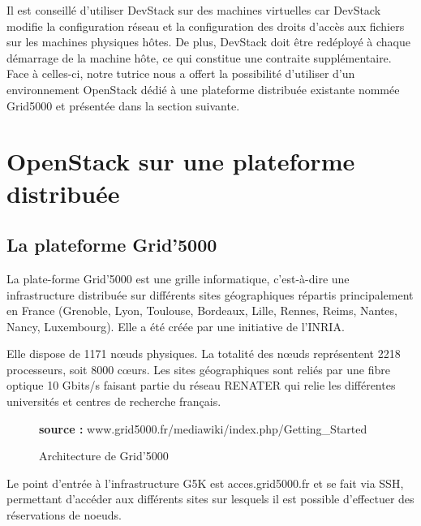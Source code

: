 \documentclass{report}
\begin{document}
    \bigbreak

    Il est conseillé d'utiliser DevStack sur des machines virtuelles car DevStack modifie la configuration réseau et la configuration des droits d'accès aux fichiers sur les machines physiques hôtes.\newline
    De plus, DevStack doit être redéployé à chaque démarrage de la machine hôte, ce qui constitue une contraite supplémentaire.\newline
    Face à celles-ci, notre tutrice nous a offert la possibilité d'utiliser d'un environnement OpenStack dédié à une plateforme distribuée existante nommée Grid5000 et présentée dans la section suivante.

    \section{OpenStack sur une plateforme distribuée}

		\subsection{La plateforme Grid'5000}

La plate-forme Grid’5000 est une grille informatique, c’est-à-dire une infrastructure distribuée sur différents sites géographiques répartis principalement en France (Grenoble, Lyon, Toulouse, Bordeaux, Lille, Rennes, Reims, Nantes, Nancy, Luxembourg).
Elle a été créée par une initiative de l'INRIA.

\bigbreak

 Elle dispose de 1171 nœuds physiques. La totalité des nœuds représentent 2218 processeurs, soit  8000 cœurs. Les sites géographiques sont reliés par une fibre optique 10 Gbits/s faisant partie du réseau RENATER qui relie les différentes universités et centres de recherche français.

 \bigbreak

\begin{figure}[H]
        \caption{Architecture de Grid'5000}
        \label{grid5000}
        \hspace{\linewidth}
        \textbf{source : }www.grid5000.fr/mediawiki/index.php/Getting\_Started
\end{figure}

Le point d'entrée à l’infrastructure G5K est acces.grid5000.fr et se fait via SSH, permettant d’accéder aux différents sites sur lesquels il est possible d’effectuer des réservations de noeuds.
\bigbreak
\end{document}
